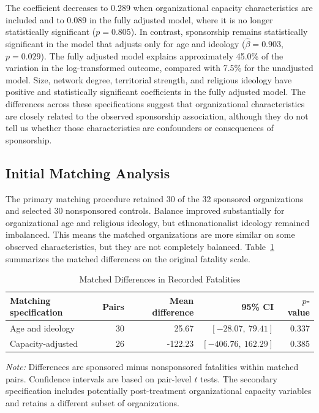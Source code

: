 \documentclass{article}
\begin{document}
The coefficient decreases to 0.289 when organizational capacity characteristics are included and to 0.089 in the fully adjusted model, where it is no longer statistically significant ($p=0.805$). In contrast, sponsorship remains statistically significant in the model that adjusts only for age and ideology ($\hat\beta=0.903$, $p=0.029$). The fully adjusted model explains approximately 45.0\% of the variation in the log-transformed outcome, compared with 7.5\% for the unadjusted model. Size, network degree, territorial strength, and religious ideology have positive and statistically significant coefficients in the fully adjusted model. The differences across these specifications suggest that organizational characteristics are closely related to the observed sponsorship association, although they do not tell us whether those characteristics are confounders or consequences of sponsorship.

\subsection{Initial Matching Analysis}

The primary matching procedure retained 30 of the 32 sponsored organizations and selected 30 nonsponsored controls. Balance improved substantially for organizational age and religious ideology, but ethnonationalist ideology remained imbalanced. This means the matched organizations are more similar on some observed characteristics, but they are not completely balanced. Table~\ref{tab:part3_matching} summarizes the matched differences on the original fatality scale.

\begin{table}[htbp]
\centering
\caption{Matched Differences in Recorded Fatalities}
\label{tab:part3_matching}
\begin{tabular}{lrrrr}
\hline
Matching specification & Pairs & Mean difference & 95\% CI & $p$-value \\
\hline
Age and ideology & 30 & 25.67 & $[-28.07,\ 79.41]$ & 0.337 \\
Capacity-adjusted & 26 & -122.23 & $[-406.76,\ 162.29]$ & 0.385 \\
\hline
\end{tabular}
\par\smallskip
{\small\textit{Note:} Differences are sponsored minus nonsponsored fatalities within matched pairs. Confidence intervals are based on pair-level $t$ tests. The secondary specification includes potentially post-treatment organizational capacity variables and retains a different subset of organizations.}
\end{table}
\end{document}
